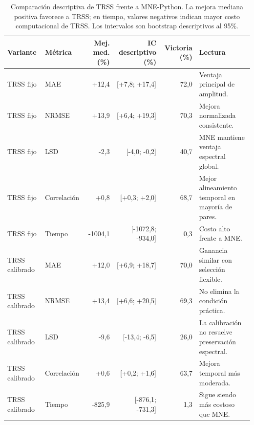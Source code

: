 \begin{table}[htbp]
\centering
\footnotesize
\setlength{\tabcolsep}{4pt}
\caption[Comparación descriptiva TRSS--MNE]{Comparación descriptiva de TRSS frente a MNE-Python. La mejora mediana positiva favorece a TRSS; en tiempo, valores negativos indican mayor costo computacional de TRSS. Los intervalos son bootstrap descriptivos al 95\%.}
\label{tab:ch6_robust_main}
\begin{tabular}{@{}llrrrp{2.8cm}@{}}
\toprule
Variante & Métrica & Mej. med. (\%) & IC descriptivo (\%) & Victoria (\%) & Lectura \\
\midrule
TRSS fijo & MAE & +12{,}4 & [+7{,}8; +17{,}4] & 72{,}0 & Ventaja principal de amplitud. \\
TRSS fijo & NRMSE & +13{,}9 & [+6{,}4; +19{,}3] & 70{,}3 & Mejora normalizada consistente. \\
TRSS fijo & LSD & -2{,}3 & [-4{,}0; -0{,}2] & 40{,}7 & MNE mantiene ventaja espectral global. \\
TRSS fijo & Correlación & +0{,}8 & [+0{,}3; +2{,}0] & 68{,}7 & Mejor alineamiento temporal en mayoría de pares. \\
TRSS fijo & Tiempo & -1004{,}1 & [-1072{,}8; -934{,}0] & 0{,}3 & Costo alto frente a MNE. \\
\addlinespace
TRSS calibrado & MAE & +12{,}0 & [+6{,}9; +18{,}7] & 70{,}0 & Ganancia similar con selección flexible. \\
TRSS calibrado & NRMSE & +13{,}4 & [+6{,}6; +20{,}5] & 69{,}3 & No elimina la condición práctica. \\
TRSS calibrado & LSD & -9{,}6 & [-13{,}4; -6{,}5] & 26{,}0 & La calibración no resuelve preservación espectral. \\
TRSS calibrado & Correlación & +0{,}6 & [+0{,}2; +1{,}6] & 63{,}7 & Mejora temporal más moderada. \\
TRSS calibrado & Tiempo & -825{,}9 & [-876{,}1; -731{,}3] & 1{,}3 & Sigue siendo más costoso que MNE. \\
\bottomrule
\end{tabular}
\end{table}
